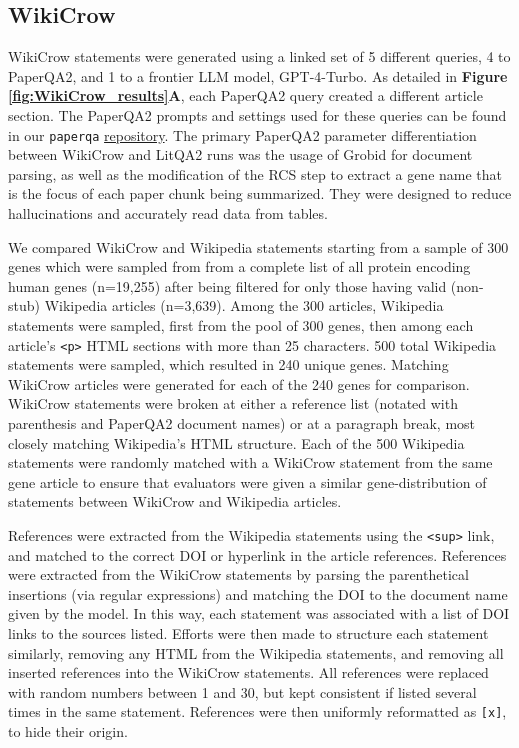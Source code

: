 \subsection{WikiCrow} \label{sec:si-wikicrow}

WikiCrow statements were generated using a linked set of 5 different queries, 4 to PaperQA2, and 1 to a frontier LLM model, GPT-4-Turbo. As detailed in \textbf{Figure \ref{fig:WikiCrow_results}A}, each PaperQA2 query created a different article section. The PaperQA2 prompts and settings used for these queries can be found in our \texttt{paperqa} \href{https://github.com/Future-House/paper-qa}{repository}. The primary PaperQA2 parameter differentiation between WikiCrow and LitQA2 runs was the usage of Grobid for document parsing, as well as the modification of the RCS step to extract a gene name that is the focus of each paper chunk being summarized. They were designed to reduce hallucinations and accurately read data from tables.

We compared WikiCrow and Wikipedia statements starting from a sample of 300 genes which were sampled from from a complete list of all protein encoding human genes \cite{enwiki:proteinlist} (n=19,255) after being filtered for only those having valid (non-stub) Wikipedia articles (n=3,639). Among the 300 articles, Wikipedia statements were sampled, first from the pool of 300 genes, then among each article's \texttt{<p>} HTML sections with more than 25 characters. 500 total Wikipedia statements were sampled, which resulted in 240 unique genes. Matching WikiCrow articles were generated for each of the 240 genes for comparison. WikiCrow statements were broken at either a reference list (notated with parenthesis and PaperQA2 document names) or at a paragraph break, most closely matching Wikipedia's HTML structure. Each of the 500 Wikipedia statements were randomly matched with a WikiCrow statement from the same gene article to ensure that evaluators were given a similar gene-distribution of statements between WikiCrow and Wikipedia articles. 

References were extracted from the Wikipedia statements using the \texttt{<sup>} link, and matched to the correct DOI or hyperlink in the article references. References were extracted from the WikiCrow statements by parsing the parenthetical insertions (via regular expressions) and matching the DOI to the document name given by the model. In this way, each statement was associated with a list of DOI links to the sources listed. Efforts were then made to structure each statement similarly, removing any HTML from the Wikipedia statements, and removing all inserted references into the WikiCrow statements. All references were replaced with random numbers between 1 and 30, but kept consistent if listed several times in the same statement. References were then uniformly reformatted as \texttt{[x]}, to hide their origin.

